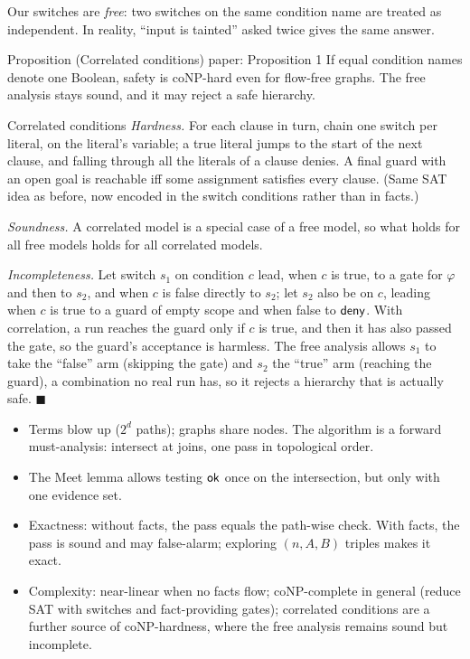 Our switches are \emph{free}: two switches on the same condition name are treated as independent. In reality, ``input is tainted'' asked twice gives the same answer.

\begin{statement}{Proposition (Correlated conditions) \hfill\normalfont paper: Proposition 1}
If equal condition names denote one Boolean, safety is coNP-hard even for flow-free graphs. The free analysis stays sound, and it may reject a safe hierarchy.
\end{statement}

\begin{plainproof}{Correlated conditions}
\emph{Hardness.} For each clause in turn, chain one switch per literal, on the literal's variable; a true literal jumps to the start of the next clause, and falling through all the literals of a clause denies. A final guard with an open goal is reachable iff some assignment satisfies every clause. (Same SAT idea as before, now encoded in the switch conditions rather than in facts.)

\emph{Soundness.} A correlated model is a special case of a free model, so what holds for all free models holds for all correlated models.

\emph{Incompleteness.} Let switch $s_1$ on condition $c$ lead, when $c$ is true, to a gate for $\varphi$ and then to $s_2$, and when $c$ is false directly to $s_2$; let $s_2$ also be on $c$, leading when $c$ is true to a guard of empty scope and when false to $\mathsf{deny}$. With correlation, a run reaches the guard only if $c$ is true, and then it has also passed the gate, so the guard's acceptance is harmless. The free analysis allows $s_1$ to take the ``false'' arm (skipping the gate) and $s_2$ the ``true'' arm (reaching the guard), a combination no real run has, so it rejects a hierarchy that is actually safe. \hfill$\blacksquare$
\end{plainproof}

\begin{recap}
\begin{itemize}
\item Terms blow up ($2^d$ paths); \Hsl{} graphs share nodes. The algorithm is a forward must-analysis: intersect at joins, one pass in topological order.
\item The Meet lemma allows testing $\mathsf{ok}$ once on the intersection, but only with one evidence set.
\item Exactness: without facts, the pass equals the path-wise check. With facts, the pass is sound and may false-alarm; exploring $(n,A,B)$ triples makes it exact.
\item Complexity: near-linear when no facts flow; coNP-complete in general (reduce SAT with switches and fact-providing gates); correlated conditions are a further source of coNP-hardness, where the free analysis remains sound but incomplete.
\end{itemize}
\end{recap}
